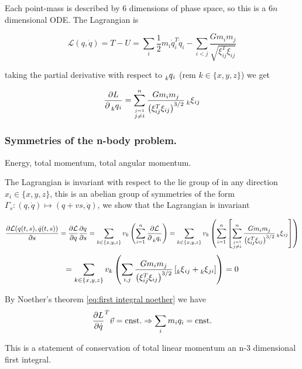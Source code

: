 \documentclass[12pt]{article}
\begin{document}
Each point-mass is described by 6 dimensions of phase space, so this is a 6$n$ dimensional ODE. The Lagrangian is 

\begin{equation}\label{eq:lagrangian n bodies}
    \mathcal L(q,\dot q) = T - U = \sum_i \frac{1}{2}m_i \dot q_i^T\dot q_i - \sum_{i<j}\frac{Gm_im_j}{\sqrt{\xi_{ij}^T\xi_{ij}}}
\end{equation}

taking the partial derivative with respect to $\prescript{}{k}{q}_{i}$ (rem $k\in\{x,y,z\}$) we get

\begin{equation}\label{eq:partial lagrangian wrt qi}
    \frac{\partial L}{\partial \prescript{}{k}{q}_i} = \sum_{\stackrel{j=1}{j\neq i}}^n \frac{Gm_im_j}{\left( \xi_{ij}^T\xi_{ij} \right)^{3/2}} \prescript{}{k}{\xi}_{ij}
\end{equation}


\subsubsection{Symmetries of the n-body problem.}
Energy, total momentum, total angular momentum. 

The Lagrangian is invariant with respect to the lie group of  in any direction $x_i \in \{x,y,z\}$, this is an abelian group of symmetries of the form $\Gamma_s : (q,\dot q)\mapsto (q+vs,\dot q)$, we show that the Lagrangian is invariant

$$
\frac{\partial\mathcal L(q(t,s),\dot q(t,s))}{\partial s} = \frac{\partial\mathcal L}{\partial q}\frac{\partial q}{\partial s} = 
\sum_{k\in\{x,y,z\}} v_k\left( \sum_{i=1}^n \frac{\partial\mathcal L}{\partial \prescript{}{k}{q_i}}
\right)
= \sum_{k\in\{x,y,z\}} v_k\left(
\sum_{i=1}^n \left[
\sum_{\stackrel{j=1}{j\neq i}}^n \frac{Gm_im_j}{\left( \xi_{ij}^T\xi_{ij} \right)^{3/2}}\prescript{}{k}{\xi}_{ij}
\right] \right)
$$
$$
= \sum_{k\in\{x,y,z\}} v_k\left(
\sum_{i,j} \frac{Gm_im_j}{\left(\xi_{ij}^T\xi_{ij}\right)^{3/2}}\left[ \prescript{}{k}{\xi}_{ij} + \prescript{}{k}{\xi}_{ji} \right]
\right) = 0
$$

By Noether's theorem \eqref{eq:first integral noether} we have
\begin{equation}\label{eq:conserved total momentum}
    \frac{\partial L}{\partial \dot q}^T \vec v = \text{cnst.} \Rightarrow \sum_i m_iq_i = \text{cnst.}
\end{equation}

This is a statement of conservation of total linear momentum an n-3 dimensional first integral. 
\end{document}
